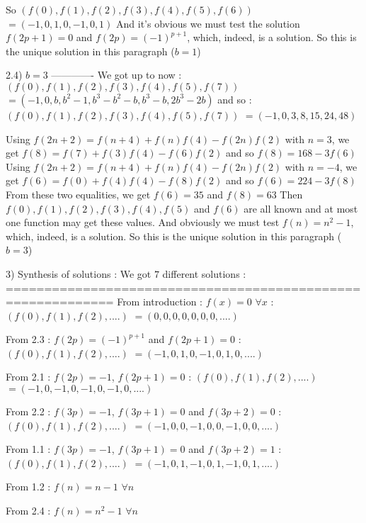 \begin{solution}
So $ (f(0),f(1),f(2),f(3),f(4),f(5),f(6))$ $ =(-1,0,1,0,-1,0,1)$
And it's obvious we must test the solution $ f(2p+1)=0$ and $ f(2p)=(-1)^{p+1}$, which, indeed, is a solution.
So this is the unique solution in this paragraph ($ b=1$)

2.4) $ b=3$
-------------
We got up to now : $ (f(0),f(1),f(2),f(3),f(4),f(5),f(7))$ $ =(-1,0,b,b^2-1,b^3-b^2-b,b^3-b,2b^3-2b)$ and so :
$ (f(0),f(1),f(2),f(3),f(4),f(5),f(7))$ $ =(-1,0,3,8,15,24,48)$

Using $ f(2n+2)=f(n+4)+f(n)f(4)-f(2n)f(2)$ with $ n=3$, we get $ f(8)=f(7)+f(3)f(4)-f(6)f(2)$ and so $ f(8)=168-3f(6)$ 
Using $ f(2n+2)=f(n+4)+f(n)f(4)-f(2n)f(2)$ with $ n=-4$, we get $ f(6)=f(0)+f(4)f(4)-f(8)f(2)$ and so $ f(6)=224-3f(8)$ 
From these two equalities, we get $ f(6)=35$ and $ f(8)=63$
Then $ f(0),f(1),f(2),f(3),f(4),f(5)$ and $ f(6)$ are all known and at most one function may get these values. And obviously we must test $ f(n)=n^2-1$, which, indeed, is a solution.
So this is the unique solution in this paragraph ($ b=3$)


3) Synthesis of solutions : We got $ 7$ different solutions :
============================================================
From introduction : $ f(x)=0$ $ \forall x$ : 
   $ (f(0),f(1),f(2),....)$ $ =(0,0,0,0,0,0,0,....)$

From 2.3 : $ f(2p)=(-1)^{p+1}$ and $ f(2p+1)=0$ : 
   $ (f(0),f(1),f(2),....)$ $ =(-1,0,1,0,-1,0,1,0,....)$

From 2.1 : $ f(2p)=-1$, $ f(2p+1)=0$ : 
   $ (f(0),f(1),f(2),....)$ $ =(-1,0,-1,0,-1,0,-1,0,....)$

From 2.2 : $ f(3p)=-1$, $ f(3p+1)=0$ and $ f(3p+2)=0$ : 
   $ (f(0),f(1),f(2),....)$ $ =(-1,0,0,-1,0,0,-1,0,0,....)$

From 1.1 : $ f(3p)=-1$, $ f(3p+1)=0$ and $ f(3p+2)=1$ : 
   $ (f(0),f(1),f(2),....)$ $ =(-1,0,1,-1,0,1,-1,0,1,....)$

From 1.2 : $ f(n)=n-1$ $ \forall n$

From 2.4 : $ f(n)=n^2-1$ $ \forall n$
\end{solution}



